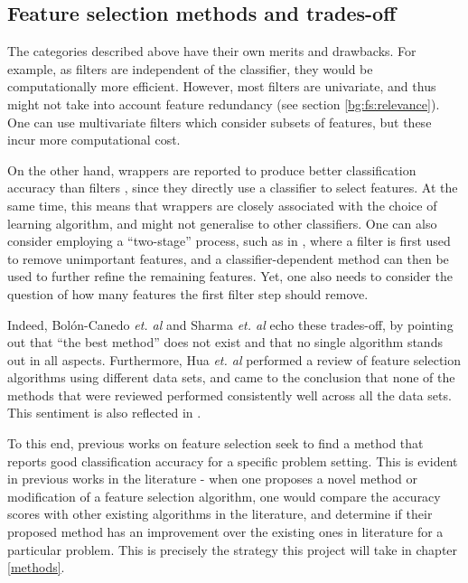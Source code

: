\documentclass[12pt, twoside, a4paper]{report}
\begin{document}
\subsection{Feature selection methods and trades-off} \label{bg:fs:tradeoff}

The categories described above have their own merits and drawbacks. For example, as filters are independent of the classifier, they would be computationally more efficient. However, most filters are univariate, and thus might not take into account feature redundancy (see section \ref{bg:fs:relevance}). One can use multivariate filters which consider subsets of features, but these incur more computational cost.

On the other hand, wrappers are reported to produce better classification accuracy than filters \cite{RefWorks:163}, since they directly use a classifier to select features. At the same time, this means that wrappers are closely associated with the choice of learning algorithm, and might not generalise to other classifiers. One can also consider employing a ``two-stage'' process, such as in \cite{RefWorks:216}, where a filter is first used to remove unimportant features, and a classifier-dependent method can then be used to further refine the remaining features. Yet, one also needs to consider the question of how many features the first filter step should remove.

Indeed, Bolón-Canedo \textit{et. al} \cite{RefWorks:163} and Sharma \textit{et. al} \cite{RefWorks:215} echo these trades-off, by pointing out that ``the best method'' does not exist and that no single algorithm stands out in all aspects. Furthermore, Hua \textit{et. al} \cite{RefWorks:216} performed a review of feature selection algorithms using different data sets, and came to the conclusion that none of the methods that were reviewed performed consistently well across all the data sets. This sentiment is also reflected in \cite{RefWorks:217}.

To this end, previous works on feature selection seek to find a method that reports good classification accuracy for a specific problem setting. This is evident in previous works in the literature - when one proposes a novel method or modification of a feature selection algorithm, one would compare the accuracy scores with other existing algorithms in the literature, and determine if their proposed method has an improvement over the existing ones in literature for a particular problem. This is precisely the strategy this project will take in chapter \ref{methods}.
\end{document}
